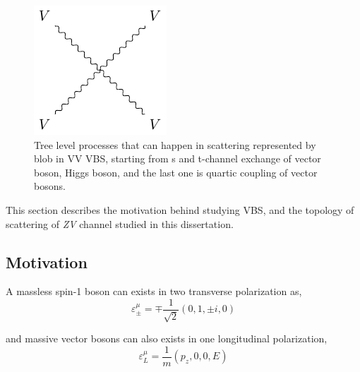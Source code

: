 \begin{figure}[!ht]
\begin{minipage}{0.18\textwidth}
  \end{minipage}%
  \begin{minipage}{0.16\textwidth}
    \includegraphics[width=\textwidth]{figures/feyn_vbs_1.pdf}
  \end{minipage}
  \caption[Tree level processes that can happen in scattering represented by blob
    in VV VBS]%
  {Tree level processes that can happen in scattering represented by blob
    in VV VBS, starting from s and t-channel exchange of
    vector boson, Higgs boson, and the last one is quartic
    coupling of vector bosons.
  }%
  \label{fig:feynman-vbs-blob}
\end{figure}

This section describes the motivation behind studying \gls{VBS}, and
the topology of scattering of \textit{ZV} channel studied in this dissertation.

\subsection{Motivation}

A massless spin-1 boson can exists in two transverse polarization as,
%
\begin{equation}
  \varepsilon^{\mu}_{\pm} = \mp \frac{1}{\sqrt{2}} (0, 1, \pm i, 0)
\end{equation}

and massive vector bosons can also exists in one longitudinal polarization,
%
\begin{equation}
  \varepsilon^{\mu}_{L} = \frac{1}{m} (p_z, 0, 0 , E)
\end{equation}

